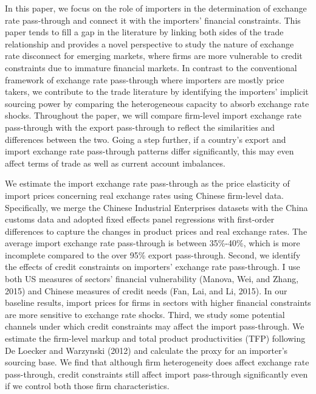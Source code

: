 In this paper, we focus on the role of importers in the determination of exchange rate pass-through and connect it with the importers' financial constraints. This paper tends to fill a gap in the literature by linking both sides of the trade relationship and provides a novel perspective to study the nature of exchange rate disconnect for emerging markets, where firms are more vulnerable to credit constraints due to immature financial markets. In contrast to the conventional framework of exchange rate pass-through where importers are mostly price takers, we contribute to the trade literature by identifying the importers' implicit sourcing power by comparing the heterogeneous capacity to absorb exchange rate shocks. Throughout the paper, we will compare firm-level import exchange rate pass-through with the export pass-through to reflect the similarities and differences between the two. Going a step further, if a country's export and import exchange rate pass-through patterns differ significantly, this may even affect terms of trade as well as current account imbalances.

We estimate the import exchange rate pass-through as the price elasticity of import prices concerning real exchange rates using Chinese firm-level data. Specifically, we merge the Chinese Industrial Enterprises datasets with the China customs data and adopted fixed effects panel regressions with first-order differences to capture the changes in product prices and real exchange rates. The average import exchange rate pass-through is between 35\%-40\%, which is more incomplete compared to the over 95\% export pass-through. Second, we identify the effects of credit constraints on importers' exchange rate pass-through. I use both US measures of sectors’ financial vulnerability (Manova, Wei, and Zhang, 2015\cite{manova-wei-zhang2015}) and Chinese measures of credit needs (Fan, Lai, and Li, 2015\cite{fan-li-yeaple2015}). In our baseline results, import prices for firms in sectors with higher financial constraints are more sensitive to exchange rate shocks. Third, we study some potential channels under which credit constraints may affect the import pass-through. We estimate the firm-level markup and total product productivities (TFP) following De Loecker and Warzynski (2012)\cite{dlw2012} and calculate the proxy for an importer's sourcing base. We find that although firm heterogeneity does affect exchange rate pass-through, credit constraints still affect import pass-through significantly even if we control both those firm characteristics. 


